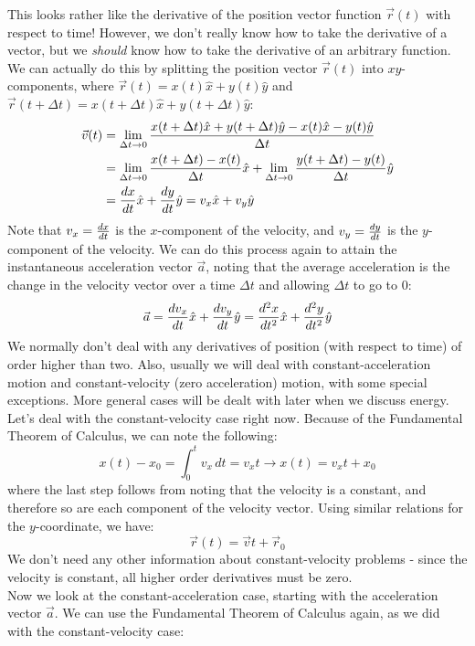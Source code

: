 This looks rather like the derivative of the position vector function $\vec{r}(t)$ with respect to time! However, we don't really know how to take the derivative of a vector, but we \textit{should} know how to take the derivative of an arbitrary function. We can actually do this by splitting the position vector $\vec{r}(t)$ into $xy$-components, where $\vec{r}(t) = x(t) \hat{x} + y(t) \hat{y}$ and $\vec{r}(t+\Delta t) = x(t+\Delta t) \hat{x} + y(t+\Delta t) \hat{y}$:
\begin{align*}
	\vec{v}(t) &= \lim_{\Delta t \rightarrow 0} \frac{x(t+\Delta t) \hat{x} + y(t+\Delta t) \hat{y} -x(t) \hat{x} -y(t) \hat{y}}{\Delta t}\\
	&= \lim_{\Delta t \rightarrow 0} \frac{x(t+\Delta t)-x(t)}{\Delta t} \hat{x} + \lim_{\Delta t \rightarrow 0}\frac{y(t+\Delta t)-y(t)}{\Delta t} \hat{y}\\
	&= \frac{d x}{d t}\hat{x} + \frac{d y}{d t} \hat{y} = v_x\hat x + v_y \hat y
\end{align*}
Note that $v_x = \frac{d x}{d t}$ is the $x$-component of the velocity, and $v_y = \frac{d y}{d t}$ is the $y$-component of the velocity. We can do this process again to attain the instantaneous acceleration vector $\vec a$, noting that the average acceleration is the change in the velocity vector over a time $\Delta t$ and allowing $\Delta t$ to go to $0$:
\[
	\vec a = \frac{d v_x}{d t}\hat x + \frac{d v_y}{d t} \hat y = \frac{d^2 x}{d t^2} \hat x + \frac{d^2 y}{d t^2} \hat y
\]
We normally don't deal with any derivatives of position (with respect to time) of order higher than two. Also, usually we will deal with constant-acceleration motion and constant-velocity (zero acceleration) motion, with some special exceptions. More general cases will be dealt with later when we discuss energy. \\
Let's deal with the constant-velocity case right now. Because of the Fundamental Theorem of Calculus, we can note the following: 
\[
	x(t) - x_0 = \int_0^t v_x \, dt = v_xt \rightarrow x(t) = v_xt + x_0
\]
where the last step follows from noting that the velocity is a constant, and therefore so are each component of the velocity vector. Using similar relations for the $y$-coordinate, we have: 
\[
	\vec r(t) = \vec v t + \vec r_0
\]
We don't need any other information about constant-velocity problems - since the velocity is constant, all higher order derivatives must be zero.\\
Now we look at the constant-acceleration case, starting with the acceleration vector $\vec a$. We can use the Fundamental Theorem of Calculus again, as we did with the constant-velocity case: 
